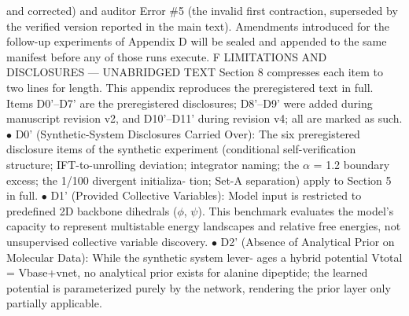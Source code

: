 \documentclass{article}
\begin{document}
and corrected) and auditor Error \#5 (the invalid first contraction, superseded by the verified version
reported in the main text). Amendments introduced for the follow-up experiments of Appendix D
will be sealed and appended to the same manifest before any of those runs execute.
F
LIMITATIONS AND DISCLOSURES --- UNABRIDGED TEXT
Section 8 compresses each item to two lines for length. This appendix reproduces the preregistered
text in full. Items D0'--D7' are the preregistered disclosures; D8'--D9' were added during manuscript
revision v2, and D10'--D11' during revision v4; all are marked as such.
$\bullet$  D0' (Synthetic-System Disclosures Carried Over): The six preregistered disclosure
items of the synthetic experiment (conditional self-verification structure; IFT-to-unrolling
deviation; integrator naming; the $\alpha$ = 1.2 boundary excess; the 1/100 divergent initializa-
tion; Set-A separation) apply to Section 5 in full.
$\bullet$  D1' (Provided Collective Variables): Model input is restricted to predefined 2D backbone
dihedrals ($\phi$, $\psi$). This benchmark evaluates the model's capacity to represent multistable
energy landscapes and relative free energies, not unsupervised collective variable discovery.
$\bullet$  D2' (Absence of Analytical Prior on Molecular Data): While the synthetic system lever-
ages a hybrid potential Vtotal = Vbase+vnet, no analytical prior exists for alanine dipeptide;
the learned potential is parameterized purely by the network, rendering the prior layer only
partially applicable.
\clearpage

\end{document}

